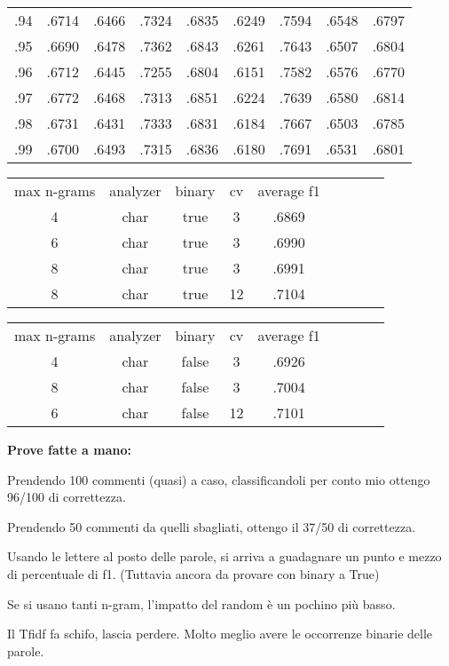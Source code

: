 \documentclass[a4paper,10pt]{article} %
\renewcommand{\b}[1]{%
    {\textbf{#1}}}
\begin{document}
\begin{tabular} {ccccccccc}
    .94  & .6714 & .6466 & .7324 & .6835 & .6249 & .7594 & .6548 & .6797  \\
    .95  & .6690 & .6478 & .7362 & .6843 & .6261 & .7643 & .6507 & .6804  \\
    .96  & .6712 & .6445 & .7255 & .6804 & .6151 & .7582 & .6576 & .6770  \\
    .97  & .6772 & .6468 & .7313 & .6851 & .6224 & .7639 & .6580 & .6814  \\
    .98  & .6731 & .6431 & .7333 & .6831 & .6184 & .7667 & .6503 & .6785  \\
    .99  & .6700 & .6493 & .7315 & .6836 & .6180 & .7691 & .6531 & .6801  \\
\end{tabular} 

\begin{tabular} {ccccccccc}
max n-grams & analyzer & binary & cv & average f1 \\
    4       &  char    & true  & 3  & .6869 \\
    6       &  char    & true  & 3  & .6990 \\
    8       &  char    & true  & 3  & .6991 \\
    8       &  char    & true  & 12  & .7104 \\
\end{tabular} 

\begin{tabular} {ccccccccc}
max n-grams & analyzer & binary & cv & average f1 \\
    4       &  char    & false  & 3  & .6926 \\
    8       &  char    & false  & 3  & .7004 \\
    6       &  char    & false  & 12  & .7101 \\
\end{tabular} 

\b{Prove fatte a mano:}

Prendendo 100 commenti (quasi) a caso, classificandoli per conto mio ottengo 96/100 di correttezza.

Prendendo 50 commenti da quelli sbagliati, ottengo il 37/50 di correttezza.

Usando le lettere al posto delle parole, si arriva a guadagnare un punto e mezzo di percentuale di f1. (Tuttavia ancora da provare con binary a True)

Se si usano tanti n-gram, l'impatto del random è un pochino più basso.

Il Tfidf fa schifo, lascia perdere. Molto meglio avere le occorrenze binarie delle parole.
\end{document}
